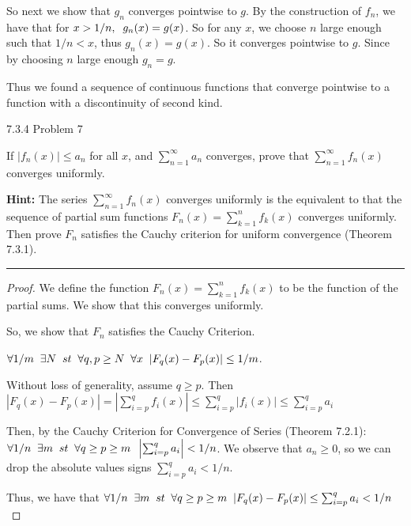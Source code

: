 \documentclass[11pt]{article}
\begin{document}
So next we show that $g_n$ converges pointwise to $g$. By the construction of $f_n$, we have 
that for $x > 1/n, \sp g_n(x) = g(x)$. So for any $x$, we choose $n$ large enough such that $1/n < x$, thus $g_n(x) = g(x)$.
So it converges pointwise to $g$. Since by choosing $n$ large enough $g_n = g$. 

Thus we found a sequence of continuous functions that converge pointwise to a function with a discontinuity of second kind.




 7.3.4 Problem 7

If $|f_n(x)| \leq a_n$ for all $x$, and $\sum_{n = 1}^ \infty a_n$ converges,
prove that $\sum_{n = 1}^ \infty f_n(x)$ converges uniformly.

\textbf{Hint:}
The series $\sum_{n = 1}^ \infty f_n(x)$ converges uniformly is the equivalent to that the sequence
of partial sum functions $F_n(x) = \sum_{k = 1} ^n f_k(x)$ converges uniformly. 
Then prove $F_n$ satisfies the Cauchy criterion for uniform convergence (Theorem 7.3.1).

\hrule

\begin{proof}
    We define the function $F_n(x) = \sum_{k = 1} ^ n f_k(x)$ to be the function of the partial sums. 
    We show that this converges uniformly.
    
    So, we show that $F_n$ satisfies the Cauchy Criterion. 

    $\forall 1/m \sp \exists N \sp st \sp \forall q,p \geq N \sp \forall x \sp |F_q(x) - F_p(x)| \leq 1/m$.

    Without loss of generality, assume $q \geq p$. Then 
    $|F_q(x) - F_p(x)| = \left| \sum_{i = p} ^q f_i(x) \right| \leq \sum_{i = p} ^q | f_i(x) | \leq \sum_{i = p} ^q a_i$

    Then, by the Cauchy Criterion for Convergence of Series (Theorem 7.2.1):
    $\forall 1/n \sp \exists m \sp st \sp \forall q \geq p \geq m \sp \left| \sum_{i = p} ^q a_i \right| < 1/n$.
    We observe that $a_n \geq 0$, so we can drop the absolute values signs $\sum_{i = p} ^q a_i < 1/n$.

    Thus, we have that $\forall 1/n \sp \exists m \sp st \sp \forall q \geq p \geq m \sp |F_q(x) - F_p(x)| \leq \sum_{i = p} ^q a_i  < 1/n$

\end{proof}
\end{document}
